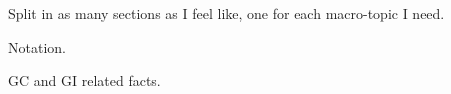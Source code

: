 
Split in as many sections as I feel like, one for each macro-topic I need.

Notation.

GC and GI related facts.